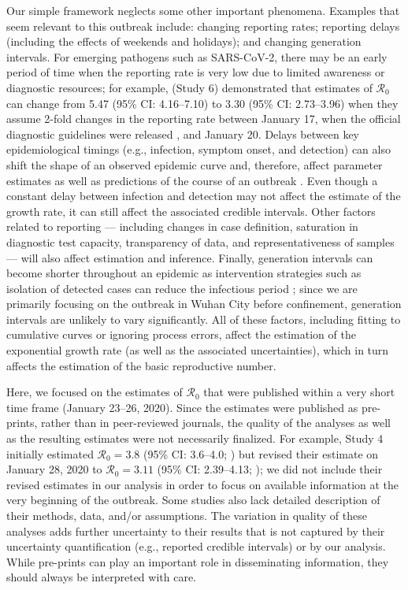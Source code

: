 \documentclass[12pt]{article}
\newcommand{\Ro}{\ensuremath{{\mathcal R}_{0}}\xspace}
\begin{document}
Our simple framework neglects some other important phenomena.
Examples that seem relevant to this outbreak include: changing reporting rates; reporting delays (including the effects of weekends and holidays); and changing generation intervals.
For emerging pathogens such as SARS-CoV-2, there may be an early period of time when the reporting rate is very low due to limited awareness or diagnostic resources;
for example, \cite{zhaoncov} (Study 6) demonstrated that estimates of \Ro can change from 5.47 (95\% CI: 4.16--7.10) to 3.30 (95\% CI: 2.73--3.96) when they assume 2-fold changes in the reporting rate between January 17, when the official diagnostic guidelines were released \citep{who17protocol}, and January 20.
Delays between key epidemiological timings (e.g., infection, symptom onset, and detection) can also shift the shape of an observed epidemic curve and, therefore, affect parameter estimates as well as predictions of the course of an outbreak \citep{tariq2019assessing}.
Even though a constant delay between infection and detection may not affect the estimate of the growth rate, it can still affect the associated credible intervals.
Other factors related to reporting --- including changes in case definition, saturation in diagnostic test capacity, transparency of data, and representativeness of samples --- will also affect estimation and inference.
Finally, generation intervals can become shorter throughout an epidemic as intervention strategies such as isolation of detected cases can reduce the infectious period \citep{hethcote2002effects};
since we are primarily focusing on the outbreak in Wuhan City before confinement, generation intervals are unlikely to vary significantly.
All of these factors, including fitting to cumulative curves or ignoring process errors, affect the estimation of the exponential growth rate (as well as the associated uncertainties), which in turn affects the estimation of the basic reproductive number.

Here, we focused on the estimates of \Ro that were published within a very short time frame (January 23--26, 2020).
Since the estimates were published as pre-prints, rather than in peer-reviewed journals, the quality of the analyses as well as the resulting estimates were not necessarily finalized.
For example, Study 4 initially estimated $\Ro = 3.8$ (95\% CI: 3.6--4.0; \cite{readncov}) but revised their estimate on January 28, 2020 to $\Ro = 3.11$ (95\% CI: 2.39--4.13; \cite{readncov2});
we did not include their revised estimates in our analysis in order to focus on available information at the very beginning of the outbreak.
Some studies also lack detailed description of their methods, data, and/or assumptions.
The variation in quality of these analyses adds further uncertainty to their results that is not captured by their uncertainty quantification (e.g., reported credible intervals) or by our analysis.
While pre-prints can play an important role in disseminating information, they should always be interpreted with care.
\end{document}
